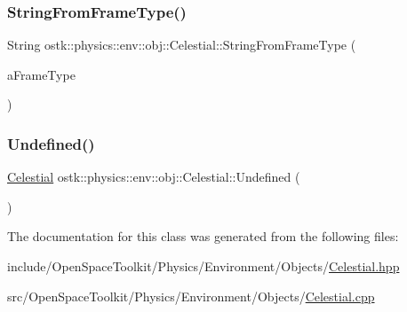 \mbox{\label{classostk_1_1physics_1_1env_1_1obj_1_1_celestial_a6002c77288a58a9c523c667036a23164}} 
\subsubsection{\texorpdfstring{String\+From\+Frame\+Type()}{StringFromFrameType()}}
{\footnotesize\ttfamily String ostk\+::physics\+::env\+::obj\+::\+Celestial\+::\+String\+From\+Frame\+Type (\begin{DoxyParamCaption}\item[{const \hyperlink{classostk_1_1physics_1_1env_1_1obj_1_1_celestial_ad005258cdc5969759c8a516fb1cfd262}{Celestial\+::\+Frame\+Type} \&}]{a\+Frame\+Type }\end{DoxyParamCaption})\hspace{0.3cm}{\ttfamily [static]}}

\mbox{\label{classostk_1_1physics_1_1env_1_1obj_1_1_celestial_ac27c062b04fa867e79c635dfd21808ca}} 
\subsubsection{\texorpdfstring{Undefined()}{Undefined()}}
{\footnotesize\ttfamily \hyperlink{classostk_1_1physics_1_1env_1_1obj_1_1_celestial}{Celestial} ostk\+::physics\+::env\+::obj\+::\+Celestial\+::\+Undefined (\begin{DoxyParamCaption}{ }\end{DoxyParamCaption})\hspace{0.3cm}{\ttfamily [static]}}



The documentation for this class was generated from the following files\+:\begin{DoxyCompactItemize}
\item 
include/\+Open\+Space\+Toolkit/\+Physics/\+Environment/\+Objects/\hyperlink{_celestial_8hpp}{Celestial.\+hpp}\item 
src/\+Open\+Space\+Toolkit/\+Physics/\+Environment/\+Objects/\hyperlink{_celestial_8cpp}{Celestial.\+cpp}\end{DoxyCompactItemize}
